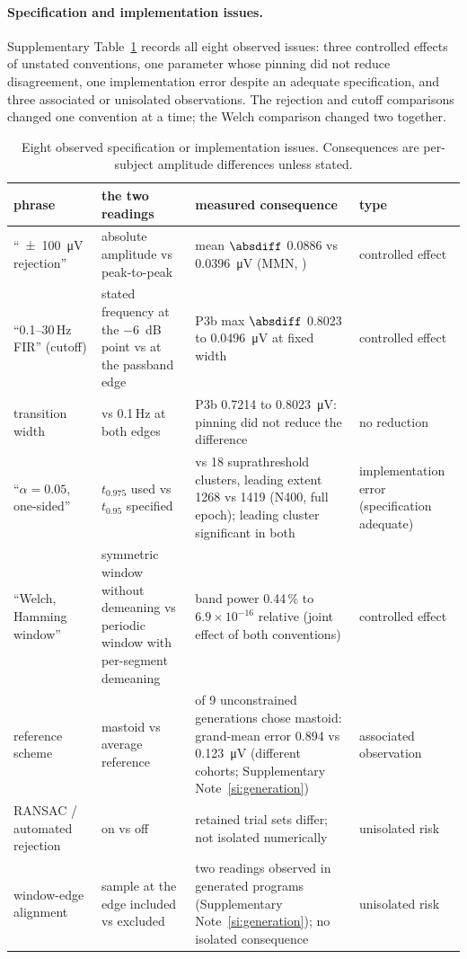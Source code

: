 \paragraph{Specification and implementation issues.}

Supplementary Table~\ref*{tab:instances} records all eight observed issues: three controlled effects of unstated conventions, one parameter whose pinning did not reduce disagreement, one implementation error despite an adequate specification, and three associated or unisolated observations. The rejection and cutoff comparisons changed one convention at a time; the Welch comparison changed two together.

\begin{table}[!htbp]
\centering\footnotesize
\caption{Eight observed specification or implementation issues. Consequences are per-subject amplitude differences unless stated.}
\label{tab:instances}
\begin{tabular}{>{\raggedright\arraybackslash}p{2.5cm}>{\raggedright\arraybackslash}p{4.0cm}>{\raggedright\arraybackslash}p{4.8cm}>{\raggedright\arraybackslash}p{2.5cm}}
\toprule
phrase & the two readings & measured consequence & type \\
\midrule
``\SI{\pm 100}{\uV} rejection'' & absolute amplitude vs peak-to-peak & mean \(\absdiff\) 0.0886 vs \SI{0.0396}{\uV} (MMN, \eeglab{}) & controlled effect \\
``0.1--30\,Hz FIR'' (cutoff) & stated frequency at the \SI{-6}{dB} point vs at the passband edge & P3b max \(\absdiff\) 0.8023 to \SI{0.0496}{\uV} at fixed width & controlled effect \\
transition width & 0.2 vs 0.1\,Hz at both edges & P3b 0.7214 to \SI{0.8023}{\uV}: pinning did not reduce the difference & no reduction \\
``\(\alpha = 0.05\), one-sided'' & \(t_{0.975}\) used vs \(t_{0.95}\) specified & 14 vs 18 suprathreshold clusters, leading extent 1268 vs 1419 (N400, full epoch); leading cluster significant in both & implementation error (specification adequate) \\
``Welch, Hamming window'' & symmetric window without demeaning vs periodic window with per-segment demeaning & band power 0.44\,\% to \(6.9\times10^{-16}\) relative (joint effect of both conventions) & controlled effect \\
reference scheme & mastoid vs average reference & 7 of 9 unconstrained generations chose mastoid: grand-mean error 0.894 vs \SI{0.123}{\uV} (different cohorts; Supplementary Note~\ref*{si:generation}) & associated observation \\
RANSAC / automated rejection & on vs off & retained trial sets differ; not isolated numerically & unisolated risk \\
window-edge alignment & sample at the edge included vs excluded & two readings observed in generated programs (Supplementary Note~\ref*{si:generation}); no isolated consequence & unisolated risk \\
\bottomrule
\end{tabular}
\end{table}
